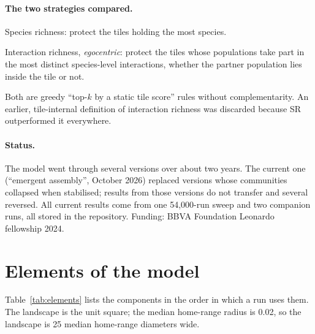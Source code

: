 \documentclass[11pt,a4paper]{article}
\begin{document}
\paragraph{The two strategies compared.}
\begin{description}[leftmargin=1.6cm,style=nextline]
\item[SR] Species richness: protect the tiles holding the most species.
\item[IR] Interaction richness, \emph{egocentric}: protect the tiles whose populations take part in the most
distinct species-level interactions, whether the partner population lies inside the tile or not.
\end{description}
Both are greedy ``top-$k$ by a static tile score'' rules without complementarity. An earlier, tile-internal
definition of interaction richness was discarded because SR outperformed it everywhere.

\paragraph{Status.} The model went through several versions over about two years. The current one (``emergent
assembly'', October 2026) replaced versions whose communities collapsed when stabilised; results from those
versions do not transfer and several reversed. All current results come from one 54,000-run sweep and two
companion runs, all stored in the repository. Funding: BBVA Foundation Leonardo fellowship 2024.

\section{Elements of the model}

Table~\ref{tab:elements} lists the components in the order in which a run uses them. The landscape is the
unit square; the median home-range radius is 0.02, so the landscape is 25 median home-range diameters wide.
\end{document}
